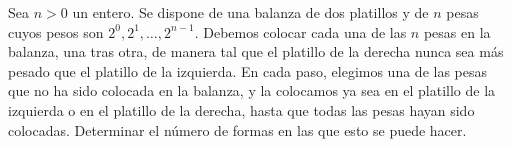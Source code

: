Sea $n > 0$ un entero. Se dispone de una balanza de dos platillos y de $n$ pesas cuyos pesos son $2^0, 2^1, \dots , 2^{n-1}$. Debemos colocar cada una de las $n$ pesas en la balanza, una tras otra, de manera tal que el platillo de la derecha nunca sea más pesado que el platillo de la izquierda. En cada paso, elegimos una de las pesas que no ha sido colocada en la balanza, y la colocamos ya sea en el platillo de la izquierda o en el platillo de la derecha, hasta que todas las pesas hayan sido colocadas. Determinar el número de formas en las que esto se puede hacer.